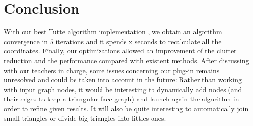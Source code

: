 \chapter*{Conclusion}


With our best Tutte algorithm implementation , we obtain an algorithm convergence in 5 iterations and it spends x seconds to recalculate all the coordinates.
Finally, our optimizations allowed an improvement of the clutter reduction and the performance compared with existent methods.
After discussing with our teachers in charge, some issues concerning our plug-in remains unresolved and could be taken into account in the future: Rather than working with input graph nodes, it would be interesting to dynamically add nodes (and their edges to keep a triangular-face graph) and launch again the algorithm in order to refine given results. It will also be quite interesting to automatically join small triangles or divide big triangles into littles ones. 

